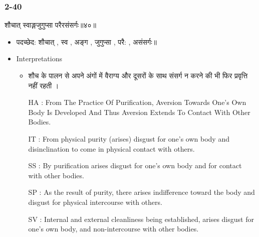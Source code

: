 \begin{frame}[fragile]\frametitle{2-40}
\begin{sanskrit}
शौचात् स्वाङ्गजुगुप्सा परैरसंसर्गः॥४०॥
\end{sanskrit}

	\begin{itemize}
	\item पदच्छेद: शौचात् , स्व , अङ्ग , जुगुप्सा , परै: , असंसर्गः॥
	\item Interpretations
		\begin{itemize}
		\item शौच के पालन से अपने अंगों में वैराग्य और दूसरों के साथ संसर्ग न करने की भी फिर प्रवृत्ति नहीं रहती ।
		\item [HA]: From The Practice Of Purification, Aversion Towards One’s Own Body Is Developed And Thus Aversion Extends To Contact With Other Bodies.
		\item [IT]: From physical purity (arises) disgust for one’s own body and disinclination to come in physical contact with others.
		\item [SS]: By purification arises disgust for one’s own body and for contact with other bodies.
		\item [SP]: As the result of purity, there arises indifference toward the body and disgust for physical intercourse with others.
		\item [SV]: Internal and external cleanliness being established, arises disgust for one’s own body, and non-intercourse with other bodies. 
		\end{itemize}
	\end{itemize}	
\end{frame}


